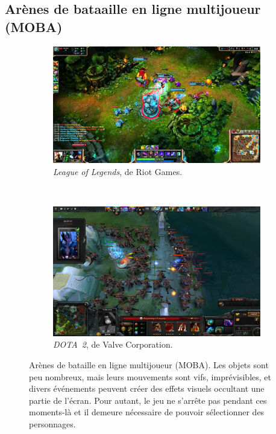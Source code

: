 \begin{appendices}
	\subsection{Arènes de bataaille en ligne multijoueur (MOBA)}
	
	\begin{figure}[!htbp]
		\begin{subfigure}[t]{0.52\textwidth}
			\centering
			\includegraphics[width=\textwidth]{figures/ch1/lol}
			\caption[Une partie du MOBA \emph{League of Legends}]{\emph{League of Legends}, de Riot Games.}
			\label{fig:lol}
		\end{subfigure}
		~
		\begin{subfigure}[t]{0.46\textwidth}
			\centering
			\includegraphics[width=\textwidth]{figures/ch1/dota2}
			\caption[Une partie d'un MOBA, \emph{DOTA~2}]{\emph{DOTA~2}, de Valve Corporation.}
			\label{fig:dota2}
		\end{subfigure}
		\label{fig:mobas}
		\caption[Arènes de bataille en ligne multijoueur (MOBA)]{Arènes de bataille en ligne multijoueur (MOBA). Les objets sont peu nombreux, mais leurs mouvements sont vifs, imprévisibles, et divers événements peuvent créer des effets visuels occultant une partie de l'écran. Pour autant, le jeu ne s'arrête pas pendant ces moments-là et il demeure nécessaire de pouvoir sélectionner des personnages.}
	\end{figure}
	

\end{appendices}

